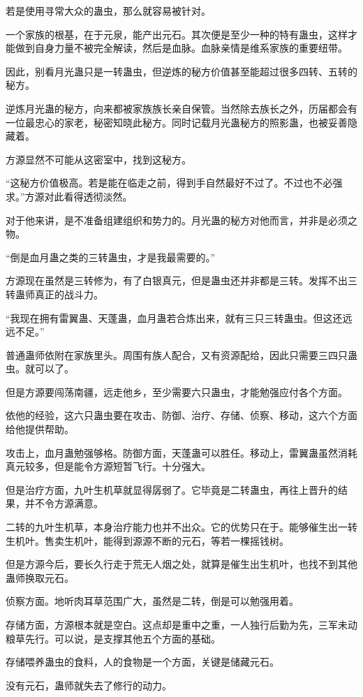 \begin{this_body}
若是使用寻常大众的蛊虫，那么就容易被针对。

一个家族的根基，在于元泉，能产出元石。其次便是至少一种的特有蛊虫，这样才能做到自身力量不被完全解读，然后是血脉。血脉亲情是维系家族的重要纽带。

因此，别看月光蛊只是一转蛊虫，但逆炼的秘方价值甚至能超过很多四转、五转的秘方。

逆炼月光蛊的秘方，向来都被家族族长亲自保管。当然除去族长之外，历届都会有一位最忠心的家老，秘密知晓此秘方。同时记载月光蛊秘方的照影蛊，也被妥善隐藏着。

方源显然不可能从这密室中，找到这秘方。

“这秘方价值极高。若是能在临走之前，得到手自然最好不过了。不过也不必强求。”方源对此看得透彻淡然。

对于他来讲，是不准备组建组织和势力的。月光蛊的秘方对他而言，并非是必须之物。

“倒是血月蛊之类的三转蛊虫，才是我最需要的。”

方源现在虽然是三转修为，有了白银真元，但是蛊虫还并非都是三转。发挥不出三转蛊师真正的战斗力。

“我现在拥有雷翼蛊、天蓬蛊，血月蛊若合炼出来，就有三只三转蛊虫。但这还远远不足。”

普通蛊师依附在家族里头。周围有族人配合，又有资源配给，因此只需要三四只蛊虫。就可以了。

但是方源要闯荡南疆，远走他乡，至少需要六只蛊虫，才能勉强应付各个方面。

依他的经验，这六只蛊虫要在攻击、防御、治疗、存储、侦察、移动，这六个方面给他提供帮助。

攻击上，血月蛊勉强够格。防御方面，天蓬蛊可以胜任。移动上，雷翼蛊虽然消耗真元较多，但是能令方源短暂飞行。十分强大。

但是治疗方面，九叶生机草就显得孱弱了。它毕竟是二转蛊虫，再往上晋升的结果，并不令方源满意。

二转的九叶生机草，本身治疗能力也并不出众。它的优势只在于。能够催生出一转生机叶。售卖生机叶，能得到源源不断的元石，等若一棵摇钱树。

但是方源今后，要长久行走于荒无人烟之处，就算是催生出生机叶，也找不到其他蛊师换取元石。

侦察方面。地听肉耳草范围广大，虽然是二转，倒是可以勉强用着。

存储方面，方源根本就是空白。这点却是重中之重，一人独行后勤为先，三军未动粮草先行。可以说，是支撑其他五个方面的基础。

存储喂养蛊虫的食料，人的食物是一个方面，关键是储藏元石。

没有元石，蛊师就失去了修行的动力。


\end{this_body}
